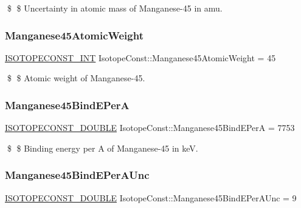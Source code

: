 \$ \$ Uncertainty in atomic mass of Manganese-\/45 in amu. \mbox{\label{group___isotope_const-_manganese-_mn45_gadcca457a8a678853ba2ced1aeb2fe631}} 
\subsubsection{\texorpdfstring{Manganese45\+Atomic\+Weight}{Manganese45AtomicWeight}}
{\footnotesize\ttfamily \mbox{\hyperlink{group___isotope_const-_macros_ga5f18360b3e99483a35c32d789e62621c}{I\+S\+O\+T\+O\+P\+E\+C\+O\+N\+S\+T\+\_\+\+I\+NT}} Isotope\+Const\+::\+Manganese45\+Atomic\+Weight = 45}

\$ \$ Atomic weight of Manganese-\/45. \mbox{\label{group___isotope_const-_manganese-_mn45_ga51aaf0be126f1bc16d626485f63be6da}} 
\subsubsection{\texorpdfstring{Manganese45\+Bind\+E\+PerA}{Manganese45BindEPerA}}
{\footnotesize\ttfamily \mbox{\hyperlink{group___isotope_const-_macros_ga8f45a7272ce02c0b4c65c44636ed719a}{I\+S\+O\+T\+O\+P\+E\+C\+O\+N\+S\+T\+\_\+\+D\+O\+U\+B\+LE}} Isotope\+Const\+::\+Manganese45\+Bind\+E\+PerA = 7753}

\$ \$ Binding energy per A of Manganese-\/45 in keV. \mbox{\label{group___isotope_const-_manganese-_mn45_ga521addcd835b012523c3c498b8af1fac}} 
\subsubsection{\texorpdfstring{Manganese45\+Bind\+E\+Per\+A\+Unc}{Manganese45BindEPerAUnc}}
{\footnotesize\ttfamily \mbox{\hyperlink{group___isotope_const-_macros_ga8f45a7272ce02c0b4c65c44636ed719a}{I\+S\+O\+T\+O\+P\+E\+C\+O\+N\+S\+T\+\_\+\+D\+O\+U\+B\+LE}} Isotope\+Const\+::\+Manganese45\+Bind\+E\+Per\+A\+Unc = 9}

